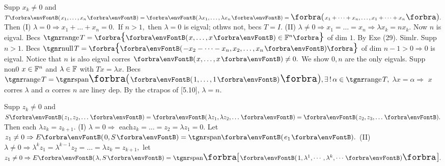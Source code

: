 Supp $x_k\neq 0$ and $T\Par{x_1,\dots,x_n}=\Par{\lambda x_1,\dots,\lambda x_n}=\BigPar{x_1+\dots+x_n,\dots,x_1+\dots+x_n}.$\parSol{}
Then (I) $\lambda=0\Rightarrow x_1+\dots+x_n=0.$ \,If $n>1,$ then $\lambda=0$ is eigval; othws not, becs $T=I.$\parSol{}
(II) $\lambda\neq 0\Rightarrow x_1=\dots=x_n\Rightarrow\lambda x_k=n x_k.$ Now $n$ is eigval.\PfEnd\vspace{2pt}\parSol{}
\Or Becs $\range T=\Bra{\Par{x,\dots,x}\in\Fbb^n}$ of dim $1.$ By Exe (29). Simlr.\PfEnd\parSol{}
\Or Supp $n>1.$ Becs $\null T=\Bra{\Par{{-x_2-\dots-x_n,x_2,\dots,x_n}}}$ of dim $n-1>0\Rightarrow 0$ is eigval.\parSol{}
Notice that $n$ is also eigval corres $\Par{x,\dots,x}\neq 0.$ We show $0,n$ are the only eigvals.\parSol{}
Supp non0 $x\in{\mathbb{F}}^n$ and $\lambda\in{\mathbb{F}}$ with $Tx=\lambda x.$ Becs $\range T=\Span[\BigPar]{\Par{1,\dots,1}},\exists\,!\,\alpha\in\range T,$\parSol{}
$\lambda x=\alpha\Rightarrow$ $x$ corres $\lambda$ and $\alpha$ corres $n$ are liney dep. By the ctrapos of [5.10], $\lambda=n.$\PfEnd
\SepLine

Supp $z_k\neq 0$ and $S\Par{z_1,z_2,\dots}=\Par{\lambda z_1,\lambda z_2,\dots}=\Par{z_2,z_3,\dots}.$ Then each $\lambda z_k=z_{k+1}.$\parSol{}
(I) $\lambda=0\Rightarrow$ each$z_k=\dots=z_2=\lambda z_1=0.$ Let $z_1\neq0\Rightarrow E\Par{0,S}=\Span{e_1}.$\parSol{}
(II) $\lambda\neq 0\Rightarrow\lambda^k z_1=\lambda^{k-1} z_2=\dots=\lambda z_k=z_{k+1},$ let $z_1\neq 0\Rightarrow E\Par{\lambda,S}=\Span[\Sbra]{\Par{1,\lambda^1,\cdots,\lambda^k,\cdots}}.$\PfEnd
\SepLine



